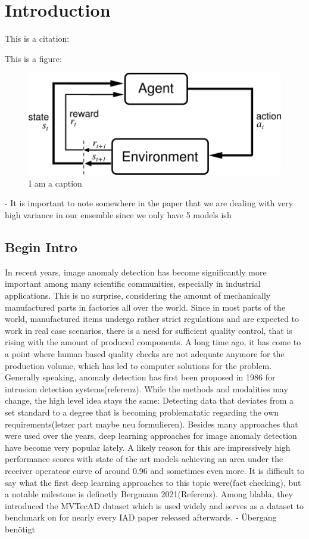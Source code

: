 \chapter{Introduction}
\label{chap:introduction}
This is a citation: \cite{patchCore2022}


This is a figure: 

\begin{figure}[ht]
    \centering
    \includegraphics[width=.5\textwidth]{figures/AgentEnviornment.png}
    \caption{I am a caption}
    \label{fig:my_label}
\end{figure}



- It is important to note somewhere in the paper that we are dealing with very high variance in our ensemble since we only have 5 models ish


\section{Begin Intro}
In recent years, image anomaly detection has become significantly more important among many scientific communities, especially in industrial applications. This is no surprise, considering the
amount of mechanically manufactured parts in factories all over the world. Since in most parts of the world, manufactured items undergo rather strict regulations and are expected to work
in real case scenarios, there is a need for sufficient quality control, that is rising with the amount of produced components. A long time ago, it has come to a point where human based quality 
checks are not adequate anymore for the production volume, which has led to computer solutions for the problem. Generally speaking, anomaly detection has first been proposed in 1986 for 
intrusion detection systems(referenz). While the methods and modalities may change, the high level idea stays the same: Detecting data that deviates from a set standard to a degree that is becoming
problematatic regarding the own requirements(letzer part maybe neu formulieren). Besides many approaches that were used over the years, deep learning approaches for image anomaly detection have
become very popular lately. A likely reason for this are impressively high performance scores with state of the art models achieving an area under the receiver operateor curve of around 0.96 and 
sometimes even more.
It is difficult to say what the first deep learning approaches to this topic were(fact checking), but a notable milestone is definetly Bergmann 2021(Referenz). Among blabla, they introduced
the MVTecAD dataset which is used widely and serves as a dataset to benchmark on for nearly every IAD paper released afterwards. - Übergang benötigt

